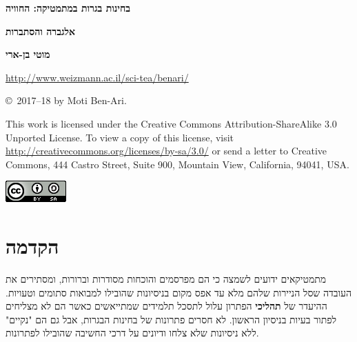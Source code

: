 
\thispagestyle{empty}

\begin{center}
\textbf{\LARGE בחינות בגרות במתמטיקה: החוויה}

\bigskip
\bigskip

\textbf{\LARGE אלגברה והסתברות}

\bigskip
\bigskip
\bigskip
\bigskip

\textbf{\Large מוטי בן-ארי}

\bigskip
\bigskip

\url{http://www.weizmann.ac.il/sci-tea/benari/}
\end{center}

\vfill


\begin{footnotesize}
\begin{center}
\copyright{}\ 2017--18 by Moti Ben-Ari.
\end{center}

This work is licensed under the Creative Commons Attribution-ShareAlike 3.0 Unported License. To view a copy of this license, visit \url{http://creativecommons.org/licenses/by-sa/3.0/} or send a letter to Creative Commons, 444 Castro Street, Suite 900, Mountain View, California, 94041, USA.
\end{footnotesize}

\bigskip

\begin{center}
\includegraphics[width=.15\textwidth]{../../by-sa.png}
\end{center}

\np
\thispagestyle{empty}
\mbox{}
\np
\thispagestyle{empty}

\tableofcontents
\np

\section*{הקדמה}

מתמטיקאים ידועים לשמצה כי הם מפרסמים והוכחות מסודרות וברורות, ומסתירים את העובדה שסל הניירות שלהם מלא עד אפס מקום בניסיונות שהובילו למבואות סתומים וטעויות. ההיעדר של 
\textbf{תהליכי}
הפתרון עלול לתסכל תלמידים שמתייאשים כאשר הם לא מצליחים לפתור בעיות בניסיון הראשון. לא חסרים פתרונות של בחינות הבגרות, אבל גם הם "נקיים" ללא ניסיונות שלא צלחו ודיונים על דרכי החשיבה שהובילו לפתרונות.

